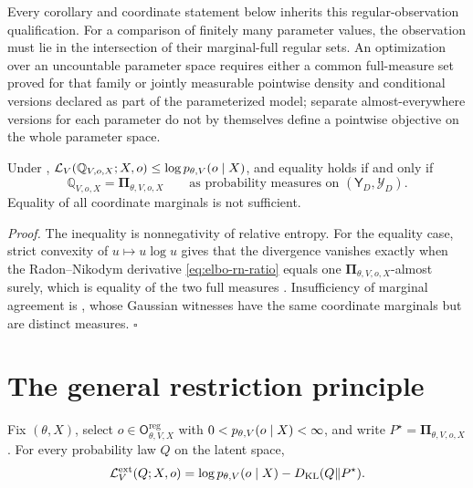 Every corollary and coordinate statement below inherits this regular-observation qualification. For a comparison of finitely many parameter values, the observation must lie in the intersection of their marginal-full regular sets. An optimization over an uncountable parameter space requires either a common full-measure set proved for that family or jointly measurable pointwise density and conditional versions declared as part of the parameterized model; separate almost-everywhere versions for each parameter do not by themselves define a pointwise objective on the whole parameter space.

Under , \(\mathcal L_V(\mathbb Q_{V,o,X};X,o)\leq\log p_{\theta,V}(o\mid X)\), and equality holds if and only if
\begin{equation}
\mathbb Q_{V,o,X}=\boldsymbol\Pi_{\theta,V,o,X}
\qquad\text{as probability measures on }(\mathsf Y_D,\mathscr Y_D).
\label{eq:elbo-equality-condition}
\end{equation}
Equality of all coordinate marginals is not sufficient. 

\emph{Proof.} The inequality is nonnegativity of relative entropy. For the equality case, strict convexity of \(u\mapsto u\log u\) gives that the divergence vanishes exactly when the Radon--Nikodym derivative \eqref{eq:elbo-rn-ratio} equals one \(\boldsymbol\Pi_{\theta,V,o,X}\)-almost surely, which is equality of the two full measures \citep{Kullback1951,Csiszar1967}. Insufficiency of marginal agreement is , whose Gaussian witnesses have the same coordinate marginals but are distinct measures. \hfill\(\square\)

\section{The general restriction principle}
\label{sec:restrict-principle}

Fix \((\theta,X)\), select
\(o\in\mathsf O_{\theta,V,X}^{\mathrm{reg}}\) with
\(0<p_{\theta,V}(o\mid X)<\infty\), and write
\(P^\star=\boldsymbol\Pi_{\theta,V,o,X}\). For every probability law \(Q\) on the latent space,
\begin{equation}
\mathcal L_V^{\mathrm{ext}}(Q;X,o)
=\log p_{\theta,V}(o\mid X)-D_{\mathrm{KL}}(Q\Vert P^\star).
\label{eq:restrict-exact-identity}
\end{equation}

